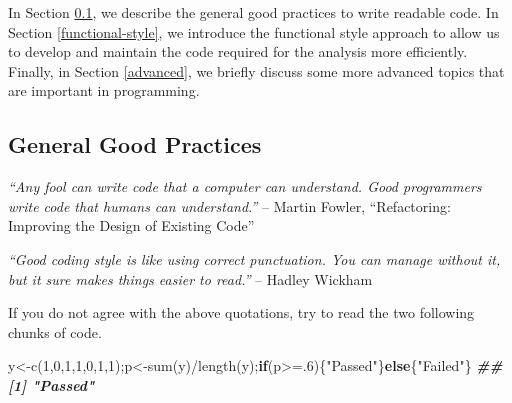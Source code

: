 \documentclass[
  11pt,
]{book}
\newenvironment{Shaded}{\begin{snugshade}}{\end{snugshade}}
\newcommand{\ControlFlowTok}[1]{\textcolor[rgb]{0.13,0.29,0.53}{\textbf{#1}}}
\newcommand{\DecValTok}[1]{\textcolor[rgb]{0.00,0.00,0.81}{#1}}
\newcommand{\DocumentationTok}[1]{\textcolor[rgb]{0.56,0.35,0.01}{\textbf{\textit{#1}}}}
\newcommand{\FunctionTok}[1]{\textcolor[rgb]{0.00,0.00,0.00}{#1}}
\newcommand{\NormalTok}[1]{#1}
\newcommand{\OtherTok}[1]{\textcolor[rgb]{0.56,0.35,0.01}{#1}}
\newcommand{\SpecialCharTok}[1]{\textcolor[rgb]{0.00,0.00,0.00}{#1}}
\newcommand{\StringTok}[1]{\textcolor[rgb]{0.31,0.60,0.02}{#1}}
\renewenvironment{quote}
               {\list{}{\rightmargin\leftmargin}%
                \item\relax\begin{line-left}\setlength{\parskip}{1em}}
               {\end{line-left}\endlist}
\newenvironment{code-tex-bad}
  {\begingroup\definecolor{shadecolor}{RGB}{255, 189, 185}}
  {\endgroup}
\begin{document}
In Section \ref{good-practices}, we describe the general good practices to write readable code. In Section \ref{functional-style}, we introduce the functional style approach to allow us to develop and maintain the code required for the analysis more efficiently. Finally, in Section \ref{advanced}, we briefly discuss some more advanced topics that are important in programming.

\hypertarget{good-practices}{%
\subsection{General Good Practices}\label{good-practices}}

\begin{quote}
\emph{``Any fool can write code that a computer can understand. Good programmers write code that humans can understand.''} -- Martin Fowler, ``Refactoring: Improving the Design of Existing Code''
\end{quote}

\begin{quote}
\emph{``Good coding style is like using correct punctuation. You can manage without it, but it sure makes things easier to read.''} -- Hadley Wickham
\end{quote}

If you do not agree with the above quotations, try to read the two following chunks of code.

\begin{code-tex-bad}

\begin{Shaded}
\begin{Highlighting}[]
\NormalTok{y}\OtherTok{\textless{}{-}}\FunctionTok{c}\NormalTok{(}\DecValTok{1}\NormalTok{,}\DecValTok{0}\NormalTok{,}\DecValTok{1}\NormalTok{,}\DecValTok{1}\NormalTok{,}\DecValTok{0}\NormalTok{,}\DecValTok{1}\NormalTok{,}\DecValTok{1}\NormalTok{);p}\OtherTok{\textless{}{-}}\FunctionTok{sum}\NormalTok{(y)}\SpecialCharTok{/}\FunctionTok{length}\NormalTok{(y);}\ControlFlowTok{if}\NormalTok{(p}\SpecialCharTok{\textgreater{}=}\NormalTok{.}\DecValTok{6}\NormalTok{)\{}\StringTok{"Passed"}\NormalTok{\}}\ControlFlowTok{else}\NormalTok{\{}\StringTok{"Failed"}\NormalTok{\}}
\DocumentationTok{\#\# [1] "Passed"}
\end{Highlighting}
\end{Shaded}

\end{code-tex-bad}
\end{document}
